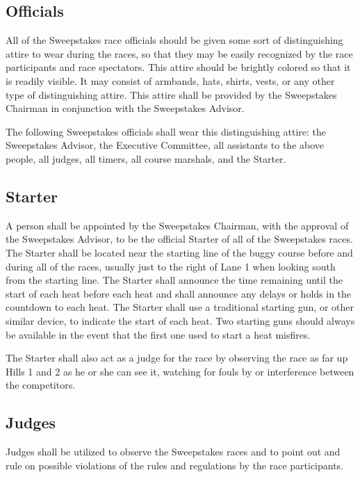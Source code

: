 \subsection{Officials}

	All of the Sweepstakes race officials should be given some sort of
	distinguishing attire to wear during the races, so that they may be easily
	recognized by the race participants and race spectators. This attire should be
	brightly colored so that it is readily visible. It may consist of armbands,
	hats, shirts, vests, or any other type of distinguishing attire. This attire
	shall be provided by the Sweepstakes Chairman in conjunction with the
	Sweepstakes Advisor.

	The following Sweepstakes officials shall wear this distinguishing attire: the
	Sweepstakes Advisor, the Executive Committee, all assistants to the above people, 
	all judges, all timers, all course marshals, and the Starter.

\subsection{Starter}

	A person shall be appointed by the Sweepstakes Chairman, with the approval of
	the Sweepstakes Advisor, to be the official Starter of all of the Sweepstakes
	races. The Starter shall be located near the starting line of the buggy course
	before and during all of the races, usually just to the right of Lane 1 when
	looking south from the starting line. The Starter shall announce the time
	remaining until the start of each heat before each heat and shall announce any
	delays or holds in the countdown to each heat. The Starter shall use a
	traditional starting gun, or other similar device, to indicate the start of
	each heat. Two starting guns should always be available in the event that the
	first one used to start a heat misfires.

	The Starter shall also act as a judge for the race by observing the race as far
	up Hills 1 and 2 as he or she can see it, watching for fouls by or interference
	between the competitors.

\subsection{Judges}

	Judges shall be utilized to observe the Sweepstakes races and to point out and
	rule on possible violations of the rules and regulations by the race
	participants.

